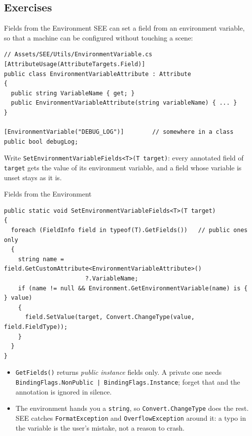 \subsection{Exercises}

\begin{exerciseframe}{Fields from the Environment}
  SEE can set a field from an environment variable, so that a machine can be
  configured without touching a scene:
  \vspace{1ex}

  \begin{lstlisting}[basicstyle=\scriptsize\ttfamily]
// Assets/SEE/Utils/EnvironmentVariable.cs
[AttributeUsage(AttributeTargets.Field)]
public class EnvironmentVariableAttribute : Attribute
{
  public string VariableName { get; }
  public EnvironmentVariableAttribute(string variableName) { ... }
}

[EnvironmentVariable("DEBUG_LOG")]        // somewhere in a class
public bool debugLog;
  \end{lstlisting}
  \vspace{1ex}

  Write \texttt{SetEnvironmentVariableFields<T>(T target)}: every annotated
  field of \texttt{target} gets the value of its environment variable, and a
  field whose variable is unset stays as it is.
\end{exerciseframe}

\begin{solutionframe}{Fields from the Environment}
  \begin{lstlisting}[basicstyle=\scriptsize\ttfamily]
public static void SetEnvironmentVariableFields<T>(T target)
{
  foreach (FieldInfo field in typeof(T).GetFields())   // public ones only
  {
    string name = field.GetCustomAttribute<EnvironmentVariableAttribute>()
                       ?.VariableName;
    if (name != null && Environment.GetEnvironmentVariable(name) is { } value)
    {
      field.SetValue(target, Convert.ChangeType(value, field.FieldType));
    }
  }
}
  \end{lstlisting}
  \vspace{0.5ex}

  \begin{itemize}
    \item \texttt{GetFields()} returns \emph{public instance} fields only. A
      private one needs \texttt{BindingFlags.NonPublic |
      BindingFlags.Instance}; forget that and the annotation is ignored in
      silence.
    \item The environment hands you a \texttt{string}, so
      \texttt{Convert.ChangeType} does the rest. SEE catches
      \texttt{FormatException} and \texttt{OverflowException} around it: a typo
      in the variable is the user's mistake, not a reason to crash.
  \end{itemize}
\end{solutionframe}

